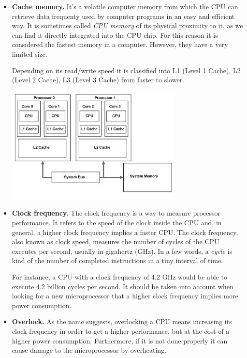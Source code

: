 \documentclass[a4paper, twoside, 11pt]{article}
\begin{document}
{\begin{itemize}
\item\textbf{Cache memory.} It's a volatile computer memory from which the CPU can retrieve data frequenty used by computer programs in an easy and efficient way. It is sometimes called \textit{CPU memory} of its physical proximity to it, as we can find it directly integrated into the CPU chip. For this reason it is considered the fastest memory in a computer. However, they have a very limited size. 

    Depending on its read/write speed it is classified into L1 (Level 1 Cache), L2 (Level 2 Cache), L3 (Level 3 Cache) from faster to slower.    
    \begin{center}
        \includegraphics[width=0.7\textwidth]{./figures/memory-diagram.jpeg}
    \end{center}

\newpage
\item\textbf{Clock frequency.} The clock frequency is a way to measure processor performance. It refers to the speed of the clock inside the CPU and, in general, a higher clock frequency implies a faster CPU. The clock frequency, also known as clock speed, measures the number of cycles of the CPU executes per second, usually in gigahertz (GHz). In a few words, a \textit{cycle} is kind of the number of completed instructions in a tiny interval of time. 

    For instance, a CPU with a clock frequency of 4.2 GHz would be able to execute 4.2 billion cycles per second. It should be taken into account when looking for a new microprocessor that a higher clock frequency implies more power consumption. 

    \item\textbf{Overlock.} As the name suggests, overlocking a CPU means increasing its clock frequency in order to get a higher performance, but at the cost of a higher power consumption. Furthermore, if it is not done properly it can cause damage to the microprocessor by overheating.


\end{itemize}}
\end{document}
